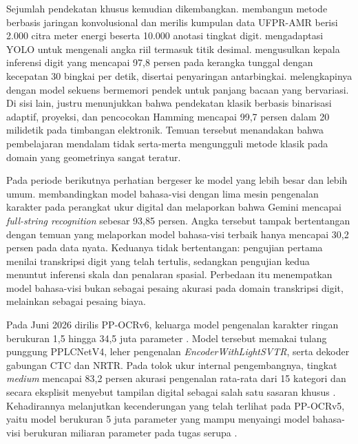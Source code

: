 Sejumlah pendekatan khusus kemudian dikembangkan. \textcite{laroca2019convolutional}
membangun metode berbasis jaringan konvolusional dan merilis kumpulan data
UFPR-AMR berisi 2.000 citra meter energi beserta 10.000 anotasi tingkat digit.
\textcite{bonilla2023adapting} mengadaptasi YOLO untuk mengenali angka riil
termasuk titik desimal. \textcite{yenneti2023lightweight} mengusulkan kepala
inferensi digit yang mencapai 97,8 persen pada kerangka tunggal dengan kecepatan
30 bingkai per detik, disertai penyaringan antarbingkai.
\textcite{wei2023novel} melengkapinya dengan model sekuens bermemori pendek
untuk panjang bacaan yang bervariasi. Di sisi lain,
\textcite{jiang2026method} justru menunjukkan bahwa pendekatan klasik berbasis
binarisasi adaptif, proyeksi, dan pencocokan Hamming mencapai 99,7 persen dalam
20 milidetik pada timbangan elektronik. Temuan tersebut menandakan bahwa
pembelajaran mendalam tidak serta-merta mengungguli metode klasik pada domain
yang geometrinya sangat teratur.

Pada periode berikutnya perhatian bergeser ke model yang lebih besar dan lebih
umum. \textcite{ega2026leveraging} membandingkan model bahasa-visi dengan lima
mesin pengenalan karakter pada perangkat ukur digital dan melaporkan bahwa
Gemini mencapai \textit{full-string recognition} sebesar 93,85 persen.
Angka tersebut tampak bertentangan dengan temuan \textcite{lin2026measurebench}
yang melaporkan model bahasa-visi terbaik hanya mencapai 30,2 persen pada data
nyata. Keduanya tidak bertentangan: pengujian pertama menilai transkripsi digit
yang telah tertulis, sedangkan pengujian kedua menuntut inferensi skala dan
penalaran spasial. Perbedaan itu menempatkan model bahasa-visi bukan sebagai
pesaing akurasi pada domain transkripsi digit, melainkan sebagai pesaing biaya.

Pada Juni 2026 dirilis PP-OCRv6, keluarga model pengenalan karakter ringan
berukuran 1,5 hingga 34,5 juta parameter \parencite{zhang2026ppocrv6}. Model
tersebut memakai tulang punggung PPLCNetV4, leher pengenalan
\textit{EncoderWithLightSVTR}, serta dekoder gabungan CTC dan NRTR. Pada tolok
ukur internal pengembangnya, tingkat \textit{medium} mencapai 83,2 persen
akurasi pengenalan rata-rata dari 15 kategori dan secara eksplisit menyebut
tampilan digital sebagai salah satu sasaran khusus
\parencite{zhang2026ppocrv6}. Kehadirannya melanjutkan kecenderungan yang telah
terlihat pada PP-OCRv5, yaitu model berukuran 5 juta parameter yang mampu
menyaingi model bahasa-visi berukuran miliaran parameter pada tugas serupa
\parencite{zhang2026ppocrv5}.

